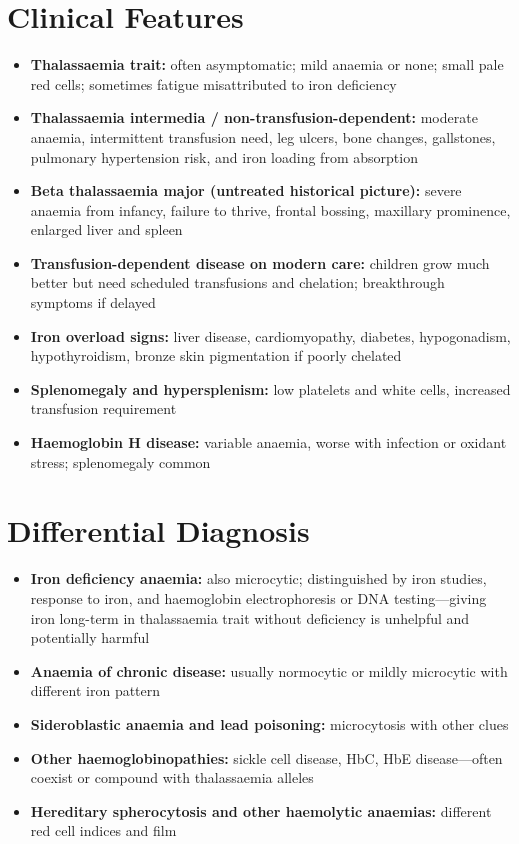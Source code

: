 \section*{Clinical Features}
\begin{itemize}
    \item \textbf{Thalassaemia trait:} often asymptomatic; mild anaemia or none; small pale red cells; sometimes fatigue misattributed to iron deficiency
    \item \textbf{Thalassaemia intermedia / non-transfusion-dependent:} moderate anaemia, intermittent transfusion need, leg ulcers, bone changes, gallstones, pulmonary hypertension risk, and iron loading from absorption
    \item \textbf{Beta thalassaemia major (untreated historical picture):} severe anaemia from infancy, failure to thrive, frontal bossing, maxillary prominence, enlarged liver and spleen
    \item \textbf{Transfusion-dependent disease on modern care:} children grow much better but need scheduled transfusions and chelation; breakthrough symptoms if delayed
    \item \textbf{Iron overload signs:} liver disease, cardiomyopathy, diabetes, hypogonadism, hypothyroidism, bronze skin pigmentation if poorly chelated
    \item \textbf{Splenomegaly and hypersplenism:} low platelets and white cells, increased transfusion requirement
    \item \textbf{Haemoglobin H disease:} variable anaemia, worse with infection or oxidant stress; splenomegaly common
\end{itemize}

\section*{Differential Diagnosis}
\begin{itemize}
    \item \textbf{Iron deficiency anaemia:} also microcytic; distinguished by iron studies, response to iron, and haemoglobin electrophoresis or DNA testing---giving iron long-term in thalassaemia trait without deficiency is unhelpful and potentially harmful
    \item \textbf{Anaemia of chronic disease:} usually normocytic or mildly microcytic with different iron pattern
    \item \textbf{Sideroblastic anaemia and lead poisoning:} microcytosis with other clues
    \item \textbf{Other haemoglobinopathies:} sickle cell disease, HbC, HbE disease---often coexist or compound with thalassaemia alleles
    \item \textbf{Hereditary spherocytosis and other haemolytic anaemias:} different red cell indices and film
\end{itemize}

